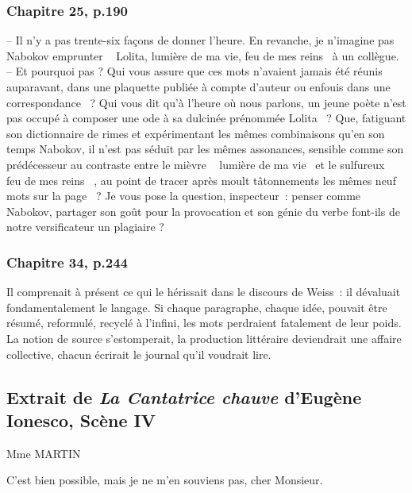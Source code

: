 \documentclass{article}
\begin{document}
			\subsubsection{Chapitre 25, p.190}\label{ada_bibli_babel}
				-- Il	 n'y	 a	 pas	 trente-six	 façons	 de	 donner	 l'heure.	 En	 revanche,	 je
				n'imagine	pas	Nabokov	emprunter	\guillemotleft~	Lolita,	lumière	de	ma	vie,	feu	de	mes
				reins	~\guillemotright	à	un	collègue.\\
				-- Et	pourquoi	pas	?	Qui	vous	assure	que	ces	mots	n'avaient	jamais	été
				réunis	 auparavant,	 dans	 une	 plaquette	 publiée	 à	 compte	 d'auteur	 ou enfouis	 dans	 une	 correspondance	~?	 Qui	 vous	 dit	 qu'à	 l'heure	 où	 nous
				parlons,	un	jeune	poète	n'est	pas	occupé	à	composer	une	ode	à	sa	dulcinée
				prénommée	 Lolita	~?	 Que,	 fatiguant	 son	 dictionnaire	 de	 rimes	 et
				expérimentant	les	mêmes	combinaisons	qu'en	son	temps	Nabokov,	il	n'est
				pas	séduit	par	les	mêmes	assonances,	sensible	comme	son	prédécesseur	au
				contraste	entre	le	mièvre	\guillemotleft~	lumière	de	ma	vie	~\guillemotright	et	le	sulfureux	\guillemotleft~	feu	de	mes
				reins	~\guillemotright,	au	point	de	tracer	après	moult	tâtonnements	les	mêmes	neuf	mots
				sur	 la	 page	~?	 Je	 vous	 pose	 la	 question,	 inspecteur~:	 penser	 comme
				Nabokov,	 partager	 son	 goût	 pour	 la	 provocation	 et	 son	 génie	 du	 verbe
				font-ils	de	notre	versificateur	un	plagiaire	?
			
			\subsubsection{Chapitre 34, p.244}\label{ada_valeur_langage}
				Il	comprenait	à	présent	ce	qui	le	hérissait	dans	le	discours	de	Weiss~:	il
				dévaluait	 fondamentalement	 le	 langage.	 Si	 chaque	 paragraphe,	 chaque
				idée,	pouvait	être	résumé,	reformulé,	recyclé	à	l'infini,	les	mots	perdraient
				fatalement	de	leur	poids.	La	notion	de	source	s'estomperait,	la	production
				littéraire	deviendrait	une	affaire	collective,	chacun	écrirait	le	journal	qu'il
				voudrait	lire.
				\newpage
		\subsection{Extrait de \textit{La Cantatrice chauve} d'Eugène Ionesco, Scène IV} \label{cantatrice}
			\begin{center}
				Mme MARTIN
			\end{center}
			C'est bien possible, mais je ne m'en souviens pas,
			cher Monsieur.
			
\end{document}
